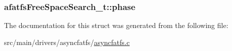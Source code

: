 \hypertarget{structafatfsFreeSpaceSearch__t_a87133484f9dd0fa70bf8d513d7a901c3}{
\subsubsection[{phase}]{ afatfs\+Free\+Space\+Search\+\_\+t\+::phase}}\label{structafatfsFreeSpaceSearch__t_a87133484f9dd0fa70bf8d513d7a901c3}


The documentation for this struct was generated from the following file\+:\begin{DoxyCompactItemize}
\item 
src/main/drivers/asyncfatfs/\hyperlink{asyncfatfs_8c}{asyncfatfs.\+c}\end{DoxyCompactItemize}
